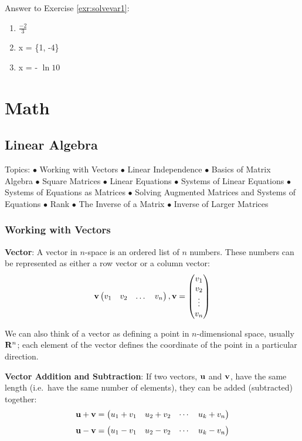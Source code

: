 \documentclass[]{book}
\theoremstyle{definition}
\theoremstyle{definition}
\theoremstyle{definition}
\theoremstyle{remark}
\begin{document}
Answer to Exercise \ref{exr:solvevar1}:

\begin{enumerate}
\def\labelenumi{\arabic{enumi}.}
\item
  \(\frac{-2}{3}\)
\item
  x = \{1, -4\}
\item
  x = - \(\ln10\)
\end{enumerate}

\hypertarget{part-math}{%
\part{Math}\label{part-math}}

\hypertarget{linearalgebra}{%
\chapter{Linear Algebra}\label{linearalgebra}}

Topics:
\(\bullet\) Working with Vectors
\(\bullet\) Linear Independence
\(\bullet\) Basics of Matrix Algebra
\(\bullet\) Square Matrices
\(\bullet\) Linear Equations
\(\bullet\) Systems of Linear Equations
\(\bullet\) Systems of Equations as Matrices
\(\bullet\) Solving Augmented Matrices and Systems of Equations
\(\bullet\) Rank
\(\bullet\) The Inverse of a Matrix
\(\bullet\) Inverse of Larger Matrices

\hypertarget{vector-def}{%
\section{Working with Vectors}\label{vector-def}}

\textbf{Vector}: A vector in \(n\)-space is an ordered list of \(n\) numbers. These numbers can be represented as either a row vector or a column vector:
\[ {\bf v} \begin{pmatrix} v_1 & v_2 & \dots & v_n\end{pmatrix} , {\bf v} = \begin{pmatrix} v_1 \\ v_2 \\ \vdots \\ v_n \end{pmatrix}\]

We can also think of a vector as defining a point in \(n\)-dimensional space, usually \({\bf R}^n\); each element of the vector defines the coordinate of the point in a particular direction.

\textbf{Vector Addition and Subtraction}: If two vectors, \({\bf u}\) and \({\bf v}\), have the same length (i.e.~have the same number of elements), they can be added (subtracted) together:
\[ {\bf u} + {\bf v} = \begin{pmatrix} u_1 + v_1 & u_2 + v_2 & \cdots & u_k + v_n \end{pmatrix}\]
\[ {\bf u} - {\bf v} = \begin{pmatrix} u_1 - v_1 & u_2 - v_2 & \cdots & u_k - v_n \end{pmatrix}\]
\end{document}
